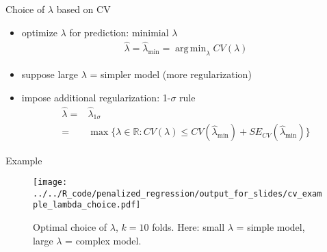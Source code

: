\documentclass[xcolor=dvipsnames, handout]{beamer}
\DeclareMathOperator{\argmin}{arg\,min}
\begin{document}
\begin{frame}{Choice of $\lambda$ based on CV}
\begin{itemize}
  \item optimize $\lambda$ for prediction: minimial $\lambda$
\begin{align*}
  \hat{\lambda} = \hat{\lambda}_{\min} = \argmin_{\lambda} CV(\lambda)
\end{align*}
\pause 
\item suppose large $\lambda$ = simpler model (more regularization)
\item impose additional regularization: 1-$\sigma$ rule
\begin{align*}
  \hat{\lambda} = & \hat{\lambda}_{1\sigma} 
\\
  =&  \max \{\lambda \in \mathbb{R} : CV(\lambda) \leq CV(\hat{\lambda}_{\min}) +  SE_{CV}(\hat{\lambda}_{\min}) \}
\end{align*}
\end{itemize}
\end{frame}

\begin{frame}{Example}
  \begin{figure}
  \texttt{[image: ../../R\_code/penalized\_regression/output\_for\_slides/cv\_example\_lambda\_choice.pdf]}
   \caption{Optimal choice of $\lambda$, $k = 10$ folds. Here: small $\lambda$ = simple model, large $\lambda$ = complex model.}
\end{figure}
\end{frame}
\end{document}
